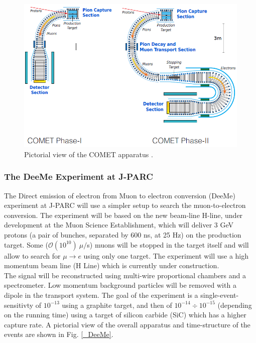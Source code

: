 \documentclass[12pt,a4paper,openright, oneside, titlepage]{book} %
\begin{document}
\begin{figure}[h!]
\centering
\includegraphics[scale=0.8]{COMET}
\caption[COMET experiment]{Pictorial view of the COMET apparatus \cite{COMET_I}.}
\label{_COMET}
\end{figure}

\subsubsection{The DeeMe Experiment at J-PARC}
The Direct emission of electron from Muon to electron conversion (DeeMe) \cite{DeeMe} experiment at J-PARC 
will use a simpler setup to search the muon-to-electron conversion. 
The experiment will be based on the new beam-line H-line, under development at the Muon Science Establishment, 
which will deliver 3 GeV protons (a pair of bunches, separated by 600 ns, at 25 Hz) on the production target. 
Some ($\mathcal{O}(10^{10})\ \mu/$s) muons will be stopped in the target itself and will allow 
to search for $\mu\rightarrow e$ using only one target. 
The experiment will use a high momentum beam line (H Line) 
which is currently under construction.\\
The signal will be reconstructed using multi-wire proportional chambers and a spectrometer. 
Low momentum background particles will be removed with a dipole in the transport system. 
The goal of the experiment is a single-event-sensitivty of $10^{-13}$ using a graphite target,
 and then of  $10^{-14}\div10^{-15}$ (depending on the running time) using a target of silicon carbide (SiC) 
 which has a higher capture rate. 
A pictorial view of the overall apparatus and time-structure of the events 
are shown in Fig. \ref{_DeeMe}.
\end{document}
